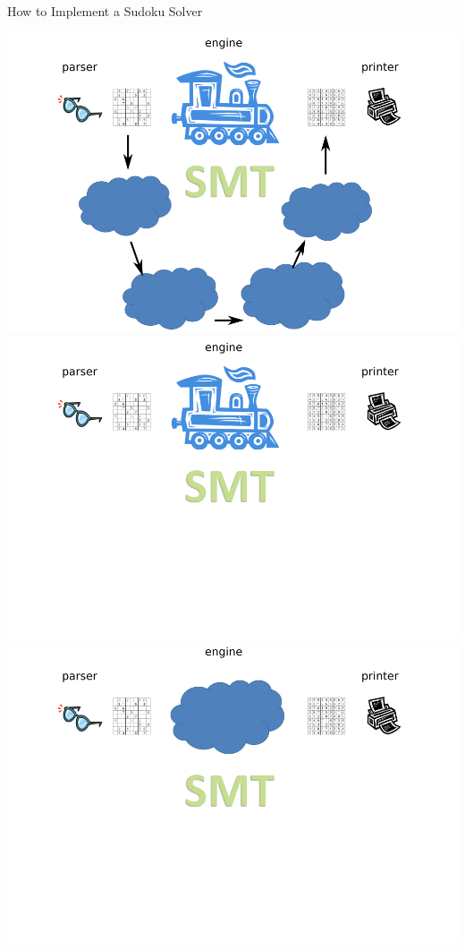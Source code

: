 \documentclass{beamer}
\begin{document}
\begin{frame}{How to Implement a Sudoku Solver}
\begin{overprint}
 \includegraphics[width=\textwidth]{current8}
 \includegraphics[width=\textwidth]{current9}
 \includegraphics[width=\textwidth]{current10}

\end{overprint}
\end{frame}
\end{document}
